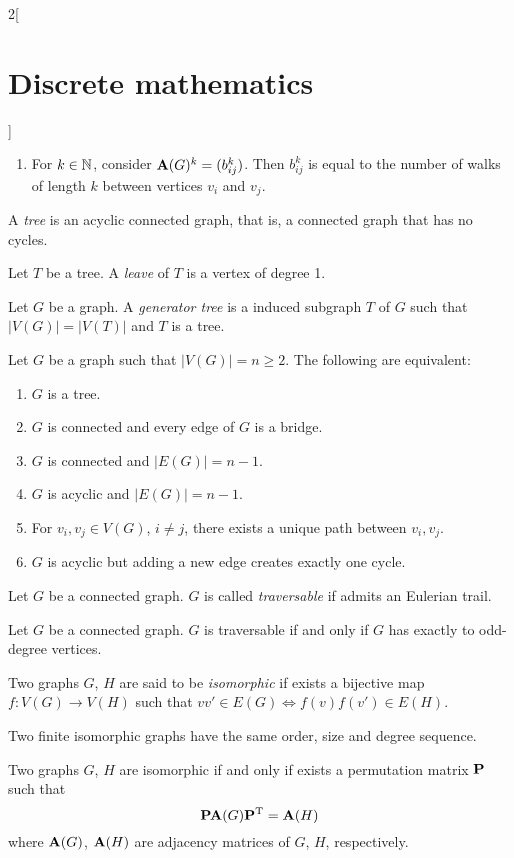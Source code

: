 \documentclass[../../../main.tex]{subfiles}
\begin{document}
\begin{multicols}{2}[\section{Discrete mathematics}]
\begin{prop}
\begin{enumerate}
    \item For $k\in\mathbb{N} $, consider $\vb{A}(G)^k=(b_{ij}^k)$. Then $b_{ij}^k$ is equal to the number of walks of length $k$ between vertices $v_i$ and $v_j$.
\end{enumerate}
\end{prop}
\begin{definition}
A \textit{tree} is an acyclic connected graph, that is, a connected graph that has no cycles.
\end{definition}
\begin{definition}
Let $T$ be a tree. A \textit{leave} of $T$ is a vertex of degree 1.
\end{definition}
\begin{definition}
Let $G$ be a graph. A \textit{generator tree} is a induced subgraph $T$ of $G$ such that $|V(G)|=|V(T)|$ and $T$ is a tree.
\end{definition}
\begin{prop}
Let $G$ be a graph such that $|V(G)|=n\geq 2$. The following are equivalent:
\begin{enumerate}
    \item $G$ is a tree.
    \item $G$ is connected and every edge of $G$ is a bridge.
    \item $G$ is connected and $|E(G)|=n-1$.
    \item $G$ is acyclic and $|E(G)|=n-1$.
    \item For $v_i,v_j\in V(G)$, $i\ne j$, there exists a unique path between $v_i,v_j$. 
    \item $G$ is acyclic but adding a new edge creates exactly one cycle.
\end{enumerate}
\end{prop}
\begin{definition}
Let $G$ be a connected graph. $G$ is called \textit{traversable} if admits an Eulerian trail.
\end{definition}
\begin{theorem}
Let $G$ be a connected graph. $G$ is traversable if and only if $G$ has exactly to odd-degree vertices.
\end{theorem}
\begin{definition}
Two graphs $G$, $H$ are said to be \textit{isomorphic} if exists a bijective map $f:V(G)\rightarrow V(H)$ such that $vv'\in E(G)\iff f(v)f(v')\in E(H)$.
\end{definition}
\begin{prop}
Two finite isomorphic graphs have the same order, size and degree sequence.
\end{prop}
\begin{theorem}
Two graphs $G$, $H$ are isomorphic if and only if exists a permutation matrix $\vb{P}$ such that $$\vb{P}\vb{A}(G)\vb{P}^{\mathrm{T}}=\vb{A}(H)$$ where $\vb{A}(G)$, $\vb{A}(H)$ are adjacency matrices of $G$, $H$, respectively.
\end{theorem}

\end{multicols}
\end{document}
